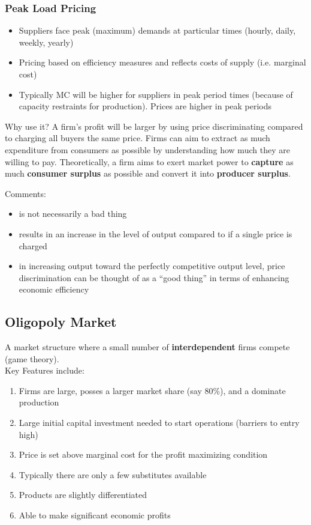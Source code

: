 \subsubsection{Peak Load Pricing}
\begin{itemize}
	\item Suppliers face peak (maximum) demands at particular times (hourly, daily, weekly, yearly)
	\item Pricing based on efficiency measures and reflects costs of supply (i.e. marginal cost)
	\item Typically MC will be higher for suppliers in peak period times (because of capacity restraints for production). Prices are higher in peak periods
\end{itemize}

\begin{note}{Why use it?}
	A firm's profit will be larger by using price discriminating compared to charging all buyers the same price. Firms can aim to extract as much expenditure from consumers as possible by understanding how much they are willing to pay. Theoretically, a firm aims to exert market power to \textbf{capture} as much \textbf{consumer surplus} as possible and convert it into \textbf{producer surplus}.
\end{note}
Comments:
\begin{itemize}
	\item is not necessarily a bad thing
	\item results in an increase in the level of output compared to if a single price is charged
	\item in increasing output toward the perfectly competitive output level, price discrimination can be thought of as a ``good thing'' in terms of enhancing economic efficiency
\end{itemize}

\subsection{Oligopoly Market}
A market structure where a small number of \textbf{interdependent} firms compete (game theory).\\ Key Features include:
\begin{enumerate}
	\item Firms are large, posses a larger market share (say 80\%), and a dominate production
	\item Large initial capital investment needed to start operations (barriers to entry high)
	\item Price is set above marginal cost for the profit maximizing condition
	\item Typically there are only a few substitutes available
	\item Products are slightly differentiated
	\item Able to make significant economic profits
\end{enumerate}
